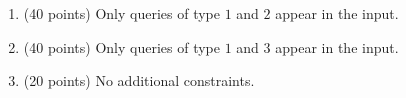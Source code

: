 \begin{enumerate}
    \tightlist
    \item (40 points) Only queries of type $1$ and $2$ appear in the input.
    \item (40 points) Only queries of type $1$ and $3$ appear in the input.
    \item (20 points) No additional constraints.
\end{enumerate}
    